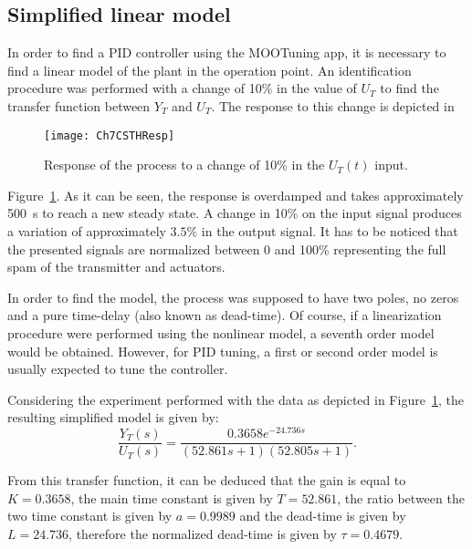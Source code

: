 \subsection{Simplified linear model}
\label{sec:SimpLinMod}
In order to find a PID controller using the MOOTuning app, it is necessary to find a linear model of the plant in the operation point. An identification procedure was performed with a change of 10\% in the value of $U_T$ to find the transfer function between $Y_T$ and $U_T$. The response to this change is depicted in %
\begin{figure}[tb]
	\centering
	\texttt{[image: Ch7CSTHResp]}
	\caption{Response of the process to a change of 10\% in the $U_T(t)$ input.}
	\label{fig:Ch7CSTHResp}
\end{figure}
%
Figure~\ref{fig:Ch7CSTHResp}. As it can be seen, the response is overdamped and takes approximately \SI{500}{\second} to reach a new steady state. A change in 10\% on the input signal produces a variation of approximately $3.5\%$ in the output signal. It has to be noticed that the presented signals are normalized between 0 and 100\% representing the full spam of the transmitter and actuators.

In order to find the model, the process was supposed to have two poles, no zeros and a pure time-delay (also known as dead-time). Of course, if a linearization procedure were performed using the nonlinear model, a seventh order model would be obtained. However, for PID tuning, a first or second order model is usually expected to tune the controller.

Considering the experiment performed with the data as depicted in Figure~\ref{fig:Ch7CSTHResp}, the resulting simplified model is given by:
%
\begin{equation}
\frac{Y_T(s)}{U_T(s)} = \frac{0.3658 e^{-24.736 s}}{(52.861 s+1)(52.805 s +1)}.
\label{eq:TFCSTH}
\end{equation}

From this transfer function, it can be deduced that the gain is equal to $K = 0.3658$, the main time constant is given by $T = 52.861$, the ratio between the two time constant is given by $a = 0.9989$ and the dead-time is given by $L = 24.736$, therefore the normalized dead-time is given by $\tau = 0.4679$.

